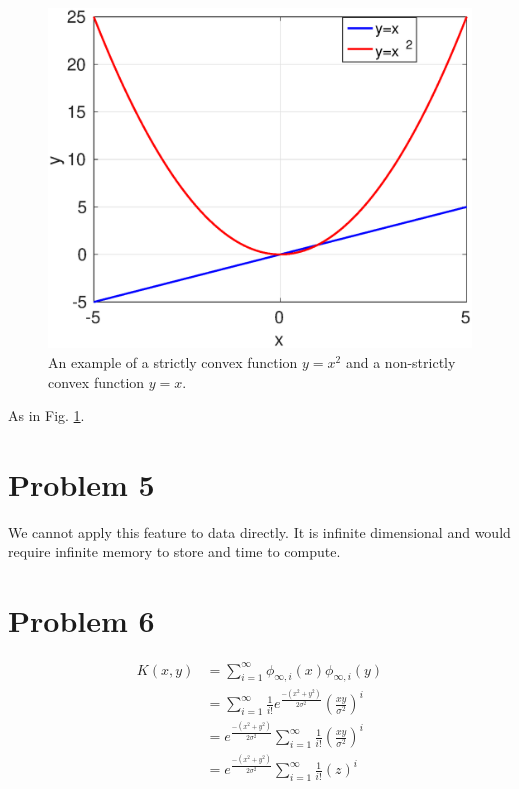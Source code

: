\documentclass[12pt]{article}
\begin{document}
\begin{figure}[!ht]
  \includegraphics[width=\linewidth]{convex}
  \caption{An example of a strictly convex function $y = x^2$ and a non-strictly convex function $y = x$.}
  \label{fig:convex}
\end{figure}

As in Fig. \ref{fig:convex}.
  
\section*{Problem 5}

We cannot apply this feature to data directly. It is infinite dimensional and would require infinite memory to store and time to compute.

\section*{Problem 6}

\begin{equation}
\begin{align}
 K(x, y) &= \sum_{i=1}^\infty \phi_{\infty, i}(x)\phi_{\infty, i}(y) \\
	 &= \sum_{i=1}^\infty \frac{1}{i!} e^\frac{-(x^2 + y^2)}{2 \sigma^2} \left( \frac{xy}{\sigma^2} \right)^i \\
	 &= e^\frac{-(x^2 + y^2)}{2 \sigma^2} \sum_{i=1}^\infty \frac{1}{i!} \left( \frac{xy}{\sigma^2} \right)^i \\
	 &= e^\frac{-(x^2 + y^2)}{2 \sigma^2} \sum_{i=1}^\infty \frac{1}{i!} \left( z \right)^i
 \end{align}
\end{equation}
\end{document}
